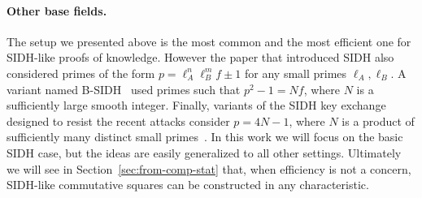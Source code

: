 \paragraph{Other base fields.}
The setup we presented above is the most common and the most efficient one for SIDH-like proofs of knowledge.
However the paper that introduced SIDH also considered primes of the form $p = \ell_A^n \ell_B^m f \pm 1$ for any small primes $\ell_A,\ell_B$.
A variant named B-SIDH~\cite{10.1007/978-3-030-64834-3_15} used primes such that $p^2 - 1 = Nf$, where $N$ is a sufficiently large smooth integer.
Finally, variants of the SIDH key exchange designed to resist the recent attacks consider $p = 4N - 1$, where $N$ is a product of sufficiently many distinct small primes~\cite{cryptoeprint:2023/013}.
In this work we will focus on the basic SIDH case, but the ideas are easily generalized to all other settings.
Ultimately we will see in Section~\ref{sec:from-comp-stat} that, when efficiency is not a concern, SIDH-like commutative squares can be constructed in any characteristic.

